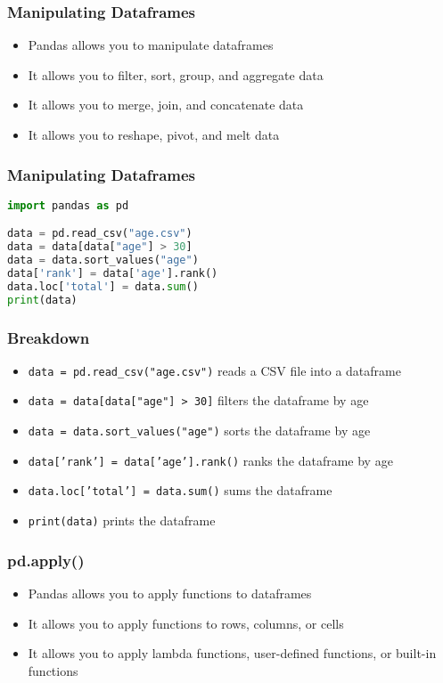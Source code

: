 \documentclass[serif, 9pt, aspectratio=32]{beamer}
\begin{document}
\begin{frame}
    \centering
    \frametitle{Manipulating Dataframes}
    \begin{itemize}
        \setlength{\itemsep}{2em}
        \item Pandas allows you to manipulate dataframes
        \item It allows you to filter, sort, group, and aggregate data
        \item It allows you to merge, join, and concatenate data
        \item It allows you to reshape, pivot, and melt data
    \end{itemize}
\end{frame}

\begin{frame}[fragile]
    \frametitle{Manipulating Dataframes}
    \begin{lstlisting}[language=Python]
import pandas as pd

data = pd.read_csv("age.csv")
data = data[data["age"] > 30]
data = data.sort_values("age")
data['rank'] = data['age'].rank()
data.loc['total'] = data.sum()
print(data)
    \end{lstlisting}
\end{frame}

\begin{frame}
    \centering
    \frametitle{Breakdown}
    \begin{itemize}
        \setlength{\itemsep}{2em}
        \item \texttt{data = pd.read\_csv("age.csv")} reads a CSV file into a dataframe
        \item \texttt{data = data[data["age"] > 30]} filters the dataframe by age
        \item \texttt{data = data.sort\_values("age")} sorts the dataframe by age
        \item \texttt{data['rank'] = data['age'].rank()} ranks the dataframe by age
        \item \texttt{data.loc['total'] = data.sum()} sums the dataframe
        \item \texttt{print(data)} prints the dataframe
    \end{itemize}
\end{frame}

\begin{frame}
    \centering
    \frametitle{pd.apply()}
    \begin{itemize}
        \setlength{\itemsep}{2em}
        \item Pandas allows you to apply functions to dataframes
        \item It allows you to apply functions to rows, columns, or cells
        \item It allows you to apply lambda functions, user-defined functions, or built-in functions
    \end{itemize}
\end{frame}
\end{document}
